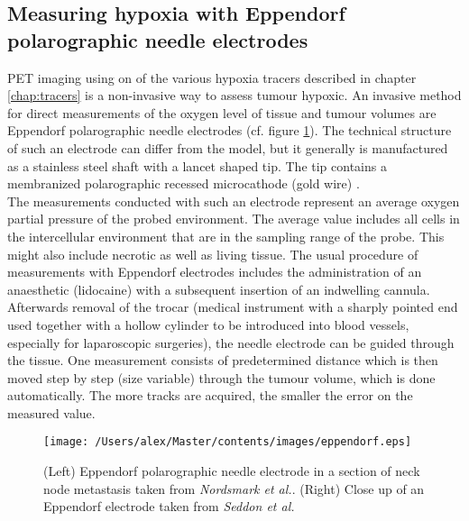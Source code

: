 \subsection[Eppendorf polarographic needle electrodes]{Measuring hypoxia with Eppendorf polarographic needle electrodes}\label{chap:eppendorf}
PET imaging using on of the various hypoxia tracers described in chapter \ref{chap:tracers} is a non-invasive way to assess tumour hypoxic. An invasive method for direct measurements of the oxygen level of tissue and tumour volumes are Eppendorf polarographic needle electrodes (cf. figure \ref{fig:eppendorf}). The technical structure of such an electrode can differ from the model, but it generally is manufactured as a stainless steel shaft with a lancet shaped tip. The tip contains a membranized polarographic recessed microcathode (gold wire) \cite{pmid8018370}.\\The measurements conducted with such an electrode represent an average oxygen partial pressure of the probed environment. The average value includes all cells in the intercellular environment that are in the sampling range of the probe. This might also include necrotic as well as living tissue. The usual procedure of measurements with Eppendorf electrodes includes the administration of an anaesthetic (lidocaine) with a subsequent insertion of an indwelling cannula. Afterwards removal of the trocar (medical instrument with a sharply pointed end used together with a hollow cylinder to be introduced into blood vessels, especially for laparoscopic surgeries), the needle electrode can be guided through the tissue. One measurement consists of predetermined distance which is then moved step by step (size variable) through the tumour volume, which is done automatically. The more tracks are acquired, the smaller the error on the measured value. 
\begin{figure}[hbt]
\centering
\texttt{[image: /Users/alex/Master/contents/images/eppendorf.eps]}
\vspace{1cm}
\caption{(Left) Eppendorf polarographic needle electrode in a section of neck node metastasis taken from \textit{Nordsmark et al.}\cite{pmid8018370}. (Right) Close up of an Eppendorf electrode taken from \textit{Seddon et al.}\cite{pmid11352767}}
\label{fig:eppendorf}
\end{figure}
